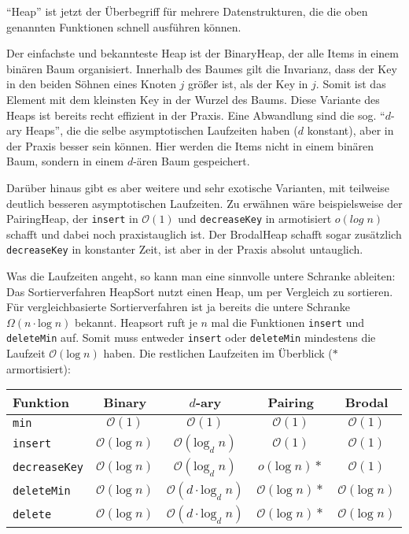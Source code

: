 \documentclass[11pt]{scrartcl} %
\newcommand{\func}[1]{\mbox{\texttt{#1}}}
\begin{document}
\enquote{Heap} ist jetzt der Überbegriff für mehrere Datenstrukturen, die die oben genannten Funktionen schnell ausführen können.

Der einfachste und bekannteste Heap ist der BinaryHeap, der alle Items in einem binären Baum organisiert. Innerhalb des Baumes gilt die Invarianz, dass der Key in den beiden Söhnen eines Knoten $j$ größer ist, als der Key in $j$. Somit ist das Element mit dem kleinsten Key in der Wurzel des Baums. Diese Variante des Heaps ist bereits recht effizient in der Praxis. Eine Abwandlung sind die sog. \enquote{$d$-ary Heaps}, die die selbe asymptotischen Laufzeiten haben ($d$ konstant), aber in der Praxis besser sein können. Hier werden die Items nicht in einem binären Baum, sondern in einem $d$-ären Baum gespeichert.

Darüber hinaus gibt es aber weitere und sehr exotische Varianten, mit teilweise deutlich besseren asymptotischen Laufzeiten. Zu erwähnen wäre beispielsweise der PairingHeap, der \func{insert} in $\mathcal O(1)$ und \func{decreaseKey} in armotisiert $o(log\;n)$ schafft und dabei noch praxistauglich ist. Der BrodalHeap schafft sogar zusätzlich \func{decreaseKey} in konstanter Zeit, ist aber in der Praxis absolut untauglich.

Was die Laufzeiten angeht, so kann man eine sinnvolle untere Schranke ableiten: Das Sortierverfahren HeapSort nutzt einen Heap, um per Vergleich zu sortieren. Für vergleichbasierte Sortierverfahren ist ja bereits die untere Schranke $\Omega(n \cdot \text{log}\;n)$ bekannt. Heapsort ruft je $n$ mal die Funktionen \func{insert} und \func{deleteMin} auf. Somit muss entweder \func{insert} oder \func{deleteMin} mindestens die Laufzeit $\mathcal O(\text{log}\;n)$ haben. Die restlichen Laufzeiten im Überblick ($*$ armortisiert):

\begin{table}[h!]
\centering
\begin{tabular}{l || c | c | c | c}
Funktion & Binary & $d$-ary & Pairing & Brodal \\
\hline\hline
\func{min}
    & $\mathcal O(1)$
    & $\mathcal O(1)$
    & $\mathcal O(1)$
    & $\mathcal O(1)$ \\
\hline
\func{insert}
    & $\mathcal O(\text{log}\;n)$
    & $\mathcal O(\text{log}_d\;n)$
    & $\mathcal O(1)$
    & $\mathcal O(1)$ \\\hline
\func{decreaseKey}
    & $\mathcal O(\text{log}\;n)$
    & $\mathcal O(\text{log}_d\;n)$
    & $o(\text{log}\;n)*$
    & $\mathcal O(1)$ \\\hline
\func{deleteMin}
    & $\mathcal O(\text{log}\;n)$
    & $\mathcal O(d \cdot \text{log}_d\;n)$
    & $\mathcal O(\text{log}\;n)*$
    & $\mathcal O(\text{log}\;n)$ \\\hline
\func{delete}
    & $\mathcal O(\text{log}\;n)$
    & $\mathcal O(d \cdot \text{log}_d\;n)$
    & $\mathcal O(\text{log}\;n)*$
    & $\mathcal O(\text{log}\;n)$ \\
\end{tabular}
\end{table}
\end{document}
